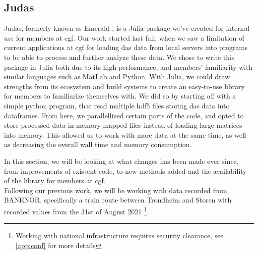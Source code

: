 \subsection{Judas}

Judas, formerly known as Emerald \cite{projthesis}, is a Julia package we've created for internal use for members at \acrshort{cgf}. Our work started last fall, when we saw a limitation of current applications at \acrshort{cgf} for loading \acrshort{das} data from local servers into programs to be able to process and further analyze these data. We chose to write this package in Julia both due to its high performance, and members' familiarity with similar languages such as MatLab and Python. With Julia, we could draw strengths from its ecosystem and build systems to create an easy-to-use library for members to familiarize themselves with. We did so by starting off with a simple python program, that read multiple \acrshort{hdf5} files storing \acrshort{das} data into dataframes. From here, we parallellized certain parts of the code, and opted to store processed data in memory mapped files instead of loading large matrices into memory. This allowed us to work with more data at the same time, as well as decreasing the overall wall time and memory consumption.  

In this section, we will be looking at what changes has been made ever since, from improvements of existent code, to new methods added and the availability of the library for members at \acrshort{cgf}. \\

Following our previous work, we will be working with data recorded from BANENOR, specifically a train route between Trondheim and Storen with recorded values from the 31st of August 2021 \footnote{Working with national infrastructure requires security clearance, see \ref{app:conf} for more details}. 

